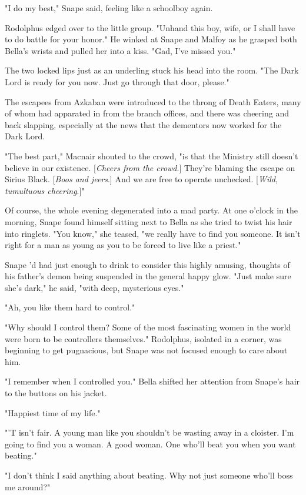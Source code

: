 "I do my best," Snape said, feeling like a schoolboy again.

Rodolphus edged over to the little group. "Unhand this boy, wife, or I shall have to do battle for your honor." He winked at Snape and Malfoy as he grasped both Bella's wrists and pulled her into a kiss. "Gad, I've missed you."

The two locked lips just as an underling stuck his head into the room. "The Dark Lord is ready for you now. Just go through that door, please."

The escapees from Azkaban were introduced to the throng of Death Eaters, many of whom had apparated in from the branch offices, and there was cheering and back slapping, especially at the news that the dementors now worked for the Dark Lord.

"The best part," Macnair shouted to the crowd, "is that the Ministry still doesn't believe in our existence. [\emph{Cheers from the crowd}.] They're blaming the escape on Sirius Black. [\emph{Boos and jeers}.] And we are free to operate unchecked. [\emph{Wild, tumultuous cheering}.]"

Of course, the whole evening degenerated into a mad party. At one o'clock in the morning, Snape found himself sitting next to Bella as she tried to twist his hair into ringlets. "You know," she teased, "we really have to find you someone. It isn't right for a man as young as you to be forced to live like a priest."

Snape 'd had just enough to drink to consider this highly amusing, thoughts of his father's demon being suspended in the general happy glow. "Just make sure she's dark," he said, "with deep, mysterious eyes."

"Ah, you like them hard to control."

"Why should I control them? Some of the most fascinating women in the world were born to be controllers themselves." Rodolphus, isolated in a corner, was beginning to get pugnacious, but Snape was not focused enough to care about him.

"I remember when I controlled you." Bella shifted her attention from Snape's hair to the buttons on his jacket.

"Happiest time of my life."

"'T isn't fair. A young man like you shouldn't be wasting away in a cloister. I'm going to find you a woman. A good woman. One who'll beat you when you want beating."

"I don't think I said anything about beating. Why not just someone who'll boss me around?"

